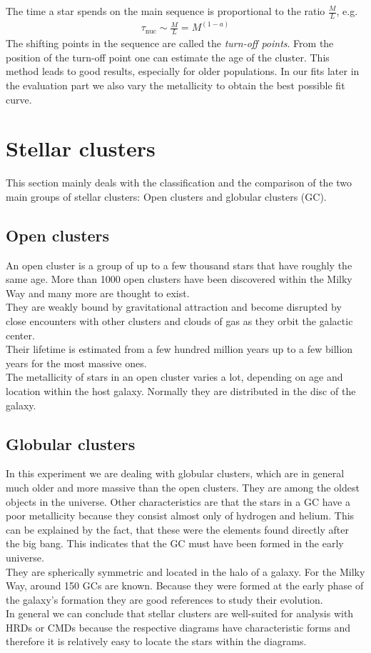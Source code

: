  The time a star spends on the main sequence is proportional to the ratio $\frac{M}{L}$, e.g.
 \begin{align}
 	\tau_{\text{nuc}} \sim \frac{M}{L} = M^{(1-a)}
 \end{align}
 The shifting points in the sequence are called the \textit{turn-off points}. From the position of the turn-off point one can estimate the age of the cluster. This method leads to good results, especially for older populations. In our fits later in the evaluation part we also vary the metallicity to obtain the best possible fit curve. 
 \section{Stellar clusters}
 This section mainly deals with the classification and the comparison of the two main groups of stellar clusters: Open clusters and globular clusters (GC).
 \subsection{Open clusters}
An open cluster is a group of up to a few thousand stars that  have roughly the same age. More than 1000 open clusters have been discovered within the Milky Way and many more are thought to exist. \\
  They are weakly bound by gravitational attraction and become disrupted by close encounters with other clusters and clouds of gas as they orbit the galactic center. \\
  Their lifetime is estimated from a few hundred million years up to a few billion years for the most massive ones. \\
  The metallicity of stars in an open cluster varies a lot, depending on age and location within the host galaxy. Normally they are distributed in the disc of the galaxy.
 \subsection{Globular clusters}
 In this experiment we are dealing with globular clusters, which are in general much older and more massive than the open clusters. They are among the oldest objects in the universe. Other characteristics are that the stars in a GC have a poor metallicity because they consist almost only of hydrogen and helium. This can be explained by the fact, that these were the elements found directly after the big bang. This indicates that the GC must have been formed in the early universe. \\
 They are spherically symmetric and located in the halo of a galaxy. For the Milky Way, around 150 GCs are known. Because they were formed at the early phase of the galaxy's formation they are good references to study their evolution.\\
 In general we can conclude that stellar clusters are well-suited for analysis with HRDs or CMDs because the respective diagrams have characteristic forms and therefore it is relatively easy to locate the stars within the diagrams.
 
